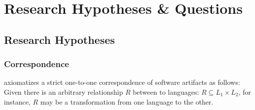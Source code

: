 \documentclass[runningheads,a4paper]{llncs}
\newcommand{\footnoteurl}[1]{\footnote{\url{#1}}}
\begin{document}
%
%
%
%

\section{Research Hypotheses \& Questions}
\label{section:ResearchHypthesesAndQuestions}
\subsection{Research Hypotheses}
\subsubsection{Correspondence}
\cite{DBLP:conf/sle/Lammel16} axiomatizes a strict one-to-one correspondence of software artifacts as follows:
Given there is an arbitrary relationship $R$ between to languages: $R \subseteq L_1 \times L_2$, for instance, $R$ may be a transformation from one language to the other.
\end{document}
